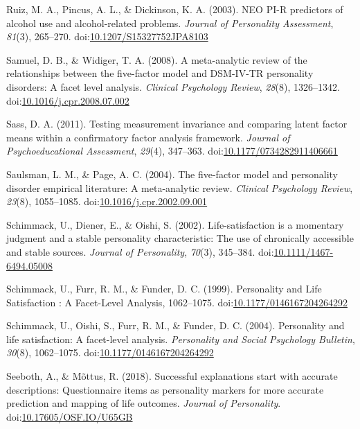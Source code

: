 \documentclass[,man]{apa6}
\theoremstyle{definition}
\theoremstyle{definition}
\theoremstyle{definition}
\theoremstyle{remark}
\begin{document}
\leavevmode\hypertarget{ref-Ruiz2003}{}%
Ruiz, M. A., Pincus, A. L., \& Dickinson, K. A. (2003). NEO PI-R
predictors of alcohol use and alcohol-related problems. \emph{Journal of
Personality Assessment}, \emph{81}(3), 265--270.
doi:\href{https://doi.org/10.1207/S15327752JPA8103}{10.1207/S15327752JPA8103}

\leavevmode\hypertarget{ref-SamuelWidiger2008}{}%
Samuel, D. B., \& Widiger, T. A. (2008). A meta-analytic review of the
relationships between the five-factor model and DSM-IV-TR personality
disorders: A facet level analysis. \emph{Clinical Psychology Review},
\emph{28}(8), 1326--1342.
doi:\href{https://doi.org/10.1016/j.cpr.2008.07.002}{10.1016/j.cpr.2008.07.002}

\leavevmode\hypertarget{ref-Sass2011}{}%
Sass, D. A. (2011). Testing measurement invariance and comparing latent
factor means within a confirmatory factor analysis framework.
\emph{Journal of Psychoeducational Assessment}, \emph{29}(4), 347--363.
doi:\href{https://doi.org/10.1177/0734282911406661}{10.1177/0734282911406661}

\leavevmode\hypertarget{ref-SaulsmanPage2004}{}%
Saulsman, L. M., \& Page, A. C. (2004). The five-factor model and
personality disorder empirical literature: A meta-analytic review.
\emph{Clinical Psychology Review}, \emph{23}(8), 1055--1085.
doi:\href{https://doi.org/10.1016/j.cpr.2002.09.001}{10.1016/j.cpr.2002.09.001}

\leavevmode\hypertarget{ref-Schimmack2002}{}%
Schimmack, U., Diener, E., \& Oishi, S. (2002). Life-satisfaction is a
momentary judgment and a stable personality characteristic: The use of
chronically accessible and stable sources. \emph{Journal of
Personality}, \emph{70}(3), 345--384.
doi:\href{https://doi.org/10.1111/1467-6494.05008}{10.1111/1467-6494.05008}

\leavevmode\hypertarget{ref-Schimmack1999}{}%
Schimmack, U., Furr, R. M., \& Funder, D. C. (1999). Personality and
Life Satisfaction : A Facet-Level Analysis, 1062--1075.
doi:\href{https://doi.org/10.1177/0146167204264292}{10.1177/0146167204264292}

\leavevmode\hypertarget{ref-Schimmack2004}{}%
Schimmack, U., Oishi, S., Furr, R. M., \& Funder, D. C. (2004).
Personality and life satisfaction: A facet-level analysis.
\emph{Personality and Social Psychology Bulletin}, \emph{30}(8),
1062--1075.
doi:\href{https://doi.org/10.1177/0146167204264292}{10.1177/0146167204264292}

\leavevmode\hypertarget{ref-Seeboth2018}{}%
Seeboth, A., \& Mõttus, R. (2018). Successful explanations start with
accurate descriptions: Questionnaire items as personality markers for
more accurate prediction and mapping of life outcomes. \emph{Journal of
Personality}.
doi:\href{https://doi.org/10.17605/OSF.IO/U65GB}{10.17605/OSF.IO/U65GB}
\end{document}
